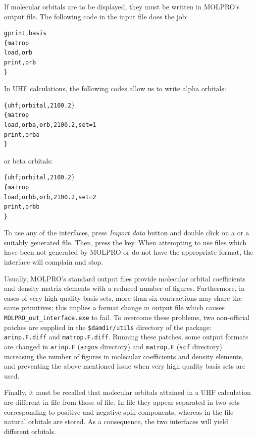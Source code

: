 \documentclass[10pt]{article}
\begin{document}
If molecular orbitals are to be displayed, they must be written in MOLPRO's
output file. The following code in the input file does the job:
\begin{verbatim}
gprint,basis
{matrop
load,orb 
print,orb
} 
\end{verbatim}

In UHF calculations, the following codes allow us to write alpha orbitals:

\begin{verbatim}
{uhf;orbital,2100.2}
{matrop
load,orba,orb,2100.2,set=1
print,orba
}
\end{verbatim}

or beta orbitals:

\begin{verbatim}
{uhf;orbital,2100.2}
{matrop
load,orbb,orb,2100.2,set=2
print,orbb
} 
\end{verbatim}

To use any of the interfaces, press {\it Import data} button \teclapuntos and double 
click on a \out{ } or a suitably generated \xml{ } file. Then, press the \exec key. 
When attempting to use files which have been not generated by MOLPRO or do not have 
the appropriate format, the interface will complain and stop.

Usually, MOLPRO's standard output files provide molecular orbital coefficients and 
density matrix elements with a reduced number of figures. Furthermore, in cases of very 
high quality basis sets, more than six contractions may share the same primitives; 
this implies a format change in output file which causes 
\texttt{MOLPRO\_out\_interface.exe} to fail. To overcome these problems, two non-official 
patches are supplied in the \texttt{\$damdir/utils} directory of the package: 
\texttt{arinp.F.diff} and \texttt{matrop.F.diff}. Running these patches, some output 
formats are changed in \texttt{arinp.F} (\texttt{argos} directory) and \texttt{matrop.F} 
(\texttt{scf} directory) increasing the number of figures in molecular coefficients 
and density elements, and preventing the above mentioned 
issue when very high quality basis sets are used.

Finally, it must be recalled that molecular orbitals attained in a 
UHF calculation are different in \out{ } file 
from those of \xml{ } file. In \out{ } file they appear separated in two sets corresponding 
to positive and negative spin components, whereas in the \xml{ } file natural orbitals 
are stored. As a consequence, the two interfaces will yield different orbitals.
\end{document}
